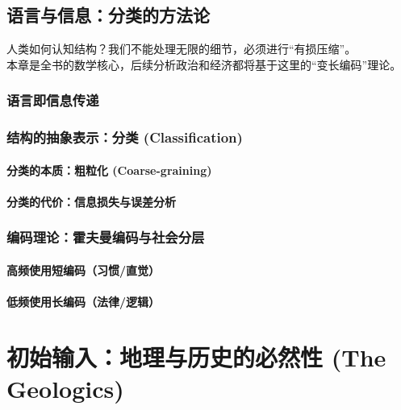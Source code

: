 \documentclass[openany, a4paper, 12pt]{book}
\newenvironment{motivation}{
	\vspace{0.5em}
	\begin{tcolorbox}[
		colback=gray!10,           %
		colframe=gray!60,          %
		title=\textit{本章动机 (Motivation)},
		fonttitle=\bfseries,
		arc=0mm,                   %
		leftrule=3mm               %
		]
		\small \itshape %
	}{
	\end{tcolorbox}
	\vspace{1em}
}
\begin{document}
	\chapter{语言与信息：分类的方法论}
	\begin{motivation}
		人类如何认知结构？我们不能处理无限的细节，必须进行“有损压缩”。\\
		本章是全书的数学核心，后续分析政治和经济都将基于这里的“变长编码”理论。
	\end{motivation}
	
	\section{语言即信息传递}
	\section{结构的抽象表示：分类 (Classification)}
	\subsection{分类的本质：粗粒化 (Coarse-graining)}
	\subsection{分类的代价：信息损失与误差分析}
	\section{编码理论：霍夫曼编码与社会分层}
	\subsection{高频使用短编码（习惯/直觉）}
	\subsection{低频使用长编码（法律/逻辑）}
	
	\part{初始输入：地理与历史的必然性 (The Geologics)}
	
\end{document}
